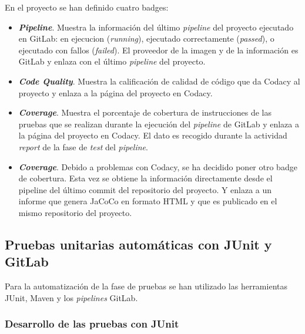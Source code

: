 En el proyecto se han definido cuatro badges:
\begin{itemize}
	\item \textit{\textbf{Pipeline}}. Muestra la información del último \textit{pipeline} del proyecto ejecutado en GitLab: en ejecucion (\textit{running}), ejecutado correctamente (\textit{passed}), o ejecutado con fallos (\textit{failed}). El proveedor de la imagen y de la información es GitLab y enlaza con el último \textit{pipeline} del proyecto.
	
	\item \textit{\textbf{Code Quality}}. Muestra la calificación de calidad de código que da Codacy al proyecto y enlaza a la página del proyecto en Codacy.
	
	\item \textit{\textbf{Coverage}}. Muestra el porcentaje de cobertura de instrucciones de las pruebas que se realizan durante la ejecución del \textit{pipeline} de GitLab y enlaza a la página del proyecto en Codacy. El dato es recogido durante la actividad \textit{report} de la fase de \textit{test} del \textit{pipeline}.
	
	\item \textit{\textbf{Coverage}}. Debido a problemas con Codacy, se ha decidido poner otro badge de cobertura. Esta vez se obtiene la información directamente desde el pipeline del último commit del repositorio del proyecto. Y enlaza a un informe que genera JaCoCo en formato HTML y que es publicado en el mismo repositorio del proyecto.
\end{itemize}

\subsection{Pruebas unitarias automáticas con JUnit y GitLab}

Para la automatización de la fase de pruebas se han utilizado las herramientas JUnit, Maven y los \textit{pipelines} GitLab.

\subsubsection{Desarrollo de las pruebas con JUnit}


